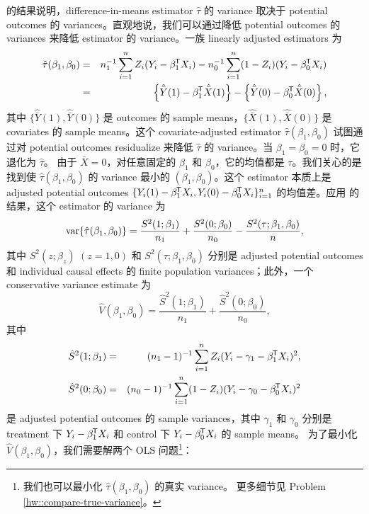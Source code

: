 \citet{Neyman:1923} 的结果说明，difference-in-means estimator $\hat{\tau}$ 的 variance 取决于 potential outcomes 的 variances。直观地说，我们可以通过降低 potential outcomes 的 variances 来降低 estimator 的 variance。一族 linearly adjusted estimators 为
\begin{eqnarray} 
\hat{\tau}(\beta_1, \beta_0) &=& n_1^{-1} \sum_{i=1}^n Z_i(Y_i - \beta_1^{\mkern-1.5mu\mathsf{T}} X_i) - n_0^{-1} \sum_{i=1}^n (1-Z_i) (Y_i - \beta_0^{\mkern-1.5mu\mathsf{T}} X_i)  \label{eq::linear-adj-1}\\
&=& \left\{  \hat{\bar{Y}}(1) - \beta_1^{\mkern-1.5mu\mathsf{T}} \hat{\bar{X} }(1) \right\}  -  \left\{   \hat{\bar{Y}}(0) - \beta_0^{\mkern-1.5mu\mathsf{T}} \hat{\bar{X} }(0) \right\},
\label{eq::linear-adj-2}
\end{eqnarray}
其中 $\{ \hat{\bar{Y}}(1), \hat{\bar{Y}}(0) \}$ 是 outcomes 的 sample means，$\{ \hat{\bar{X} }(1), \hat{\bar{X} }(0)\}$ 是 covariates 的 sample means。这个 covariate-adjusted estimator $\hat{\tau}(\beta_1, \beta_0)$ 试图通过对 potential outcomes residualize 来降低 $\hat\tau$ 的 variance。当 $\beta_1 = \beta_0 = 0$ 时，它退化为 $\hat\tau$。
由于 $\bar{X}  = 0$，对任意固定的 $\beta_1$ 和 $\beta_0$，它的均值都是 $\tau$。我们关心的是找到使 $\hat{\tau}(\beta_1, \beta_0)$ 的 variance 最小的 $(\beta_1, \beta_0)$。这个 estimator 本质上是 adjusted potential outcomes $\{ Y_i(1) - \beta_1^{\mkern-1.5mu\mathsf{T}} X_i  , Y_i(0) - \beta_0^{\mkern-1.5mu\mathsf{T}}  X_i \}_{i=1}^n $ 的均值差。应用 \citet{Neyman:1923} 的结果，这个 estimator 的 variance 为
$$
\textup{var}\{ \hat{\tau}(\beta_1, \beta_0) \} = \frac{ {S}^2(1; \beta_1) }{ n_1 } + \frac{ {S}^2(0; \beta_0) }{ n_0 }
- \frac{  S^2(\tau; \beta_1, \beta_0)  }{ n },
$$
其中 $ {S}^2(z; \beta_z)$ $(z=1,0)$ 和 $S^2(\tau; \beta_1, \beta_0)$ 分别是 adjusted potential outcomes 和 individual causal effects 的 finite population variances；此外，一个 conservative variance estimate 为
$$
\hat{V}( \beta_1, \beta_0 ) = \frac{ \hat{S}^2(1; \beta_1) }{ n_1 } + \frac{ \hat{S}^2(0; \beta_0) }{ n_0 },
$$
其中
\begin{eqnarray*}
\hat{S}^2(1; \beta_1) &=& (n_1-1)^{-1} \sum_{i=1}^n Z_i  ( Y_i - \gamma_1 - \beta_1^{\mkern-1.5mu\mathsf{T}}  X_i )^2,\\ 
\hat{S}^2(0; \beta_0) &=& (n_0-1)^{-1} \sum_{i=1}^n (1-Z_i)  ( Y_i - \gamma_0 - \beta_0^{\mkern-1.5mu\mathsf{T}}  X_i )^2
\end{eqnarray*}
是 adjusted potential outcomes 的 sample variances，其中 $\gamma_1$ 和 $\gamma_0$ 分别是 treatment 下 $Y_i - \beta_1^{\mkern-1.5mu\mathsf{T}}  X_i$ 和 control 下 $Y_i   - \beta_0^{\mkern-1.5mu\mathsf{T}}  X_i $ 的 sample means。
为了最小化 $\hat{V}( \beta_1, \beta_0 )$，我们需要解两个 OLS 问题\footnote{
我们也可以最小化 $\hat{\tau}(\beta_1, \beta_0) $ 的真实 variance。
更多细节见 Problem \ref{hw::compare-true-variance}。
}：
